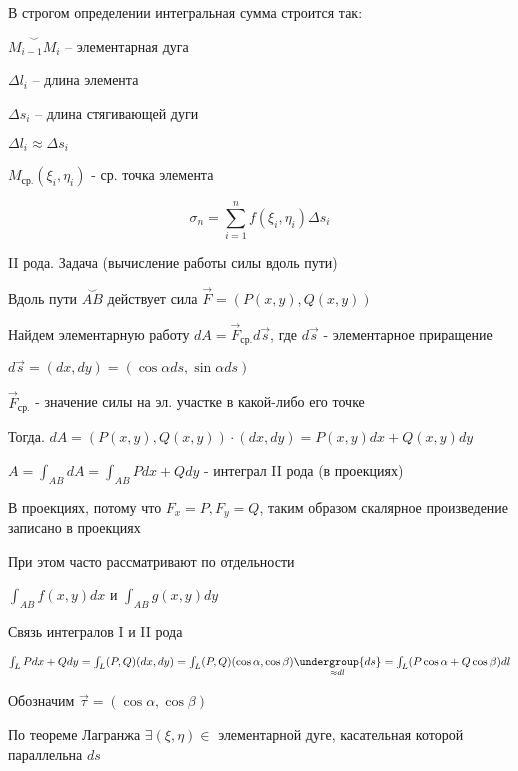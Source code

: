 \documentclass[12pt]{article}
\begin{document}
    \Nota В строгом определении интегральная сумма строится так:

    $\overset{\smile}{M_{i-1}M_i}$ -- элементарная дуга

    $\Delta l_i$ -- длина элемента

    $\Delta s_i$ -- длина стягивающей дуги

    $\Delta l_i \approx \Delta s_i$

    $M_{\text{ср.}}(\xi_i, \eta_i)$ - ср. точка элемента

    \[\sigma_n = \sum_{i = 1}^n f(\xi_i, \eta_i) \Delta s_i\]

    \hypertarget{curvilinearintegralofsecondkind}{}

    II рода. Задача (вычисление работы силы вдоль пути)

    Вдоль пути $\overset{\smile}{AB}$ действует сила $\overrightarrow{F} = (P(x, y), Q(x, y))$

    Найдем элементарную работу $dA = \overrightarrow{F}_{\text{ср.}} d\overrightarrow{s}$, где $d\overrightarrow{s}$ - элементарное приращение

    $d\overrightarrow{s} = (dx, dy) = (\cos\alpha ds, \sin\alpha ds)$

    $\overrightarrow{F}_{\text{ср.}}$ - значение силы на эл. участке в какой-либо его точке

    Тогда. $dA = (P(x, y), Q(x, y)) \cdot (dx, dy) = P(x, y)dx + Q(x, y)dy$

    $A = \int_{AB} dA = \int_{AB} Pdx + Qdy$ - интеграл II рода (в проекциях)

    \Nota В проекциях, потому что $F_x = P, F_y = Q$, таким образом скалярное произведение записано в проекциях

    При этом часто рассматривают по отдельности

    $\int_{AB} f(x, y) dx$ и $\int_{AB} g(x, y) dy$

    \hypertarget{connectionbetweencurvilinearintegrals}{}

    \Nota Связь интегралов I и II рода

    $\int_L Pdx + Qdy = \int_L (P, Q)(dx, dy) = \int_L (P, Q) (\cos\alpha, \cos\beta) \underset{\approx dl}{\undergroup{ds}} =
    \int_L (P\cos\alpha + Q\cos\beta)dl$

    Обозначим $\overrightarrow{\tau} = (\cos\alpha, \cos\beta)$

    По теореме Лагранжа $\exists (\xi, \eta) \in$ элементарной дуге, касательная которой параллельна $ds$
\end{document}
